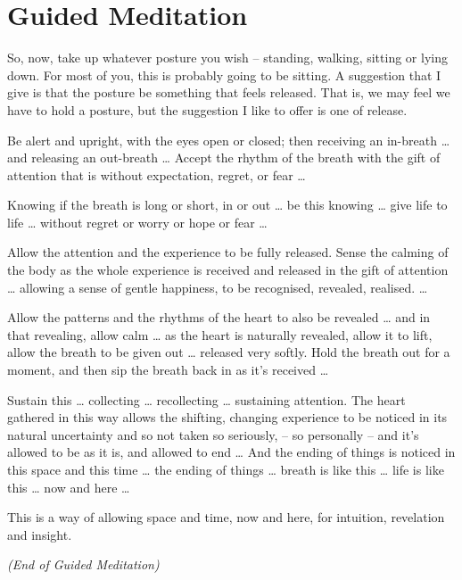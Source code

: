 \section{Guided Meditation}

So, now, take up whatever posture you wish -- standing, walking, sitting or
lying down. For most of you, this is probably going to be sitting. A suggestion
that I give is that the posture be something that feels released. That is, we
may feel we have to hold a posture, but the suggestion I like to offer is one of
release.

Be alert and upright, with the eyes open or closed; then receiving an in-breath
\ldots{} and releasing an out-breath \ldots{} Accept the rhythm of the breath
with the gift of attention that is without expectation, regret, or fear \ldots{}

Knowing if the breath is long or short, in or out \ldots{} be this knowing
\ldots{} give life to life \ldots{} without regret or worry or hope or fear
\ldots{}

Allow the attention and the experience to be fully released. Sense the calming
of the body as the whole experience is received and released in the gift of
attention \ldots{} allowing a sense of gentle happiness, to be recognised,
revealed, realised. \ldots{}

Allow the patterns and the rhythms of the heart to also be revealed \ldots{} and
in that revealing, allow calm \ldots{} as the heart is naturally revealed, allow it to lift,
allow the breath to be given out \ldots{} released very softly. Hold the breath
out for a moment, and then sip the breath back in as it's received \ldots{}

Sustain this \ldots{} collecting \ldots{} recollecting \ldots{} sustaining attention.  The heart gathered in this way allows the
shifting, changing experience to be noticed in its natural uncertainty and so not taken so seriously, -- so personally -- and it's allowed to be as it is, and allowed
to end \ldots{} And the ending of things is noticed in this space and this time
\ldots{} the ending of things \ldots{} breath is like this \ldots{} life is like
this \ldots{} now and here \ldots{}

This is a way of allowing space and time, now and here, for intuition,
revelation and insight.

\bigskip

{\centering
\textit{(End of Guided Meditation)}
\par}

